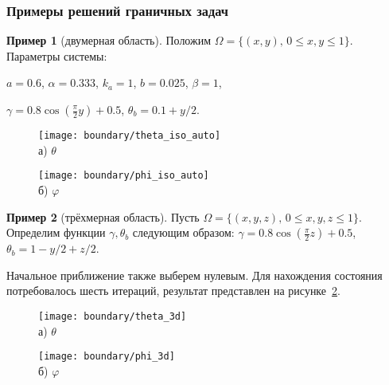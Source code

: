 \begin{frame}
    \frametitle{Примеры решений граничных задач}
    \textbf{Пример 1} (двумерная область).
    Положим $\Omega=\{(x,y),\, 0 \leq x,y \leq 1 \}$.
    Параметры системы:

    $a = 0.6$,
    $\alpha = 0.333$,
    $k_a = 1$,
    $b = 0.025$,
    $\beta = 1$,

    $\gamma = 0.8 \cos\left(\frac{\pi}{2} y\right) + 0.5$,
    $\theta_b = 0.1 + y / 2$.
    \begin{figure}[h!t]
        \begin{minipage}[b][][b]{0.49\linewidth}
            \centering
            \texttt{[image: boundary/theta\_iso\_auto]} \\ а) $\theta$
        \end{minipage}
        \hfill
        \begin{minipage}[b][][b]{0.49\linewidth}
            \centering
            \texttt{[image: boundary/phi\_iso\_auto]} \\ б) $\varphi$
        \end{minipage}
        \label{fig:4_1:boundary}
    \end{figure}
\end{frame}

\begin{frame}

    \textbf{Пример 2} (трёхмерная область).
    Пусть $\Omega=\{(x,y,z),\, 0 \leq x,y,z \leq 1 \}$.
    Определим функции $\gamma, \theta_b$ следующим образом:
    $\gamma = 0.8 \cos\left(\frac{\pi}{2} z\right) + 0.5$,
    $\theta_b = 1- y / 2 + z /2$.

    Начальное приближение также выберем нулевым.
    Для нахождения состояния потребовалось шесть итераций,
    результат представлен на рисунке~\ref{fig:4_1:boundary_3d}.
    \begin{figure}[h!t]
        \begin{minipage}[b][][b]{0.49\linewidth}
            \centering
            \texttt{[image: boundary/theta\_3d]} \\ а) $\theta$
        \end{minipage}
        \hfill
        \begin{minipage}[b][][b]{0.49\linewidth}
            \centering
            \texttt{[image: boundary/phi\_3d]} \\ б) $\varphi$
        \end{minipage}
        \label{fig:4_1:boundary_3d}
    \end{figure}
\end{frame}

